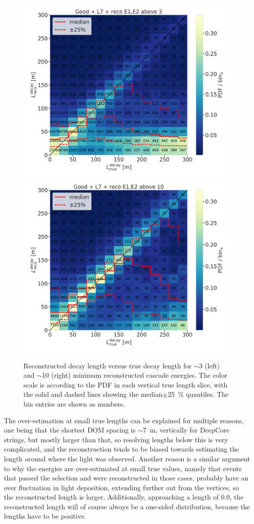 \begin{figure}[h]
    \centering
    \includegraphics[width=0.49\linewidth]{figures/results/190607/resolutions/190607_millipede_level_no_NaNs_NEW_flipped_reco_decayL_vs_true_decayL_reco_above3_step_contours.png}
    \includegraphics[width=0.49\linewidth]{figures/results/190607/resolutions/190607_millipede_level_no_NaNs_NEW_flipped_reco_decayL_vs_true_decayL_reco_above10_step_contours.png}
    \caption[Preliminary 2-d reconstructed versus true decay length resolutions]{Reconstructed decay length versus true decay length for $\sim$\SI{3}{\gev} (left) and $\sim$\SI{10}{\gev} (right) minimum reconstructed cascade energies. The color scale is according to the PDF in each vertical true length slice, with the solid and dashed lines showing the median$\pm$\SI{25}{\percent} quantiles. The bin entries are shown as numbers.}
\end{figure}

The over-estimation at small true lengths can be explained for multiple reasons, one being that the shortest DOM spacing is $\sim$\SI{7}{\meter}, vertically for DeepCore strings, but mostly larger than that, so resolving lengths below this is very complicated, and the reconstruction tends to be biased towards estimating the length around where the light was observed. Another reason is a similar argument to why the energies are over-estimated at small true values, namely that events that passed the selection and were reconstructed in those cases, probably have an over fluctuation in light deposition, extending further out from the vertices, so the reconstructed length is larger. Additionally, approaching a length of 0.0, the reconstructed length will of course always be a one-sided distribution, because the lengths have to be positive.


